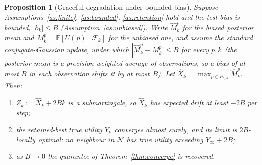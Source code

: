 \documentclass[11pt]{article}
\newtheorem{proposition}{Proposition}
\newcommand{\E}{\mathbb{E}}
\newcommand{\filt}{\mathcal{F}}     %
\begin{document}
\begin{proposition}[Graceful degradation under bounded bias]
\label{prop:bias}
Suppose Assumptions~\textup{\ref{as:finite}}, \textup{\ref{as:bounded}}, \textup{\ref{as:retention}} hold and the test bias is bounded, $|b_k|\le B$ (Assumption~\textup{\ref{as:unbiased}}). Write $\widehat M_k^{p}$ for the biased posterior mean and $M_k^{p}=\E[U(p)\mid\filt_k]$ for the unbiased one, and assume the standard conjugate-Gaussian update, under which $|\widehat M_k^{p}-M_k^{p}|\le B$ for every $p,k$ (the posterior mean is a precision-weighted average of observations, so a bias of at most $B$ in each observation shifts it by at most $B$). Let $\widehat X_k=\max_{p\in P_{r,k}}\widehat M_k^{p}$. Then:
\begin{enumerate}[label=(\roman*)]
\item $Z_k:=\widehat X_k + 2Bk$ is a submartingale, so $\widehat X_k$ has expected drift at least $-2B$ per step;
\item the retained-best true utility $Y_k$ converges almost surely, and its limit is \emph{$2B$-locally optimal}: no neighbour in $\mathcal{N}$ has true utility exceeding $Y_\infty + 2B$;
\item as $B\to0$ the guarantee of Theorem~\ref{thm:converge} is recovered.
\end{enumerate}
\end{proposition}
\end{document}
